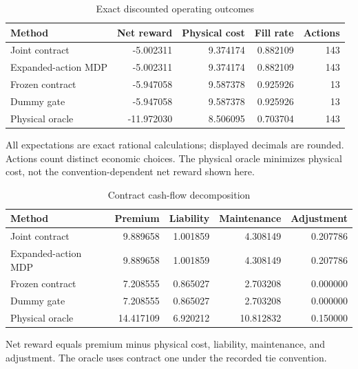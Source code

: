 \begin{table}[!ht]
\centering
\caption{Exact discounted operating outcomes}
\label{tab:exact}
\begin{tabular}{lrrrr}
\toprule
Method & Net reward & Physical cost & Fill rate & Actions\\
\midrule
Joint contract & -5.002311 & 9.374174 & 0.882109 & 143\\
Expanded-action MDP & -5.002311 & 9.374174 & 0.882109 & 143\\
Frozen contract & -5.947058 & 9.587378 & 0.925926 & 13\\
Dummy gate & -5.947058 & 9.587378 & 0.925926 & 13\\
Physical oracle & -11.972030 & 8.506095 & 0.703704 & 143\\
\bottomrule
\end{tabular}
\par\smallskip
\begin{minipage}{0.98\textwidth}\small All expectations are exact rational calculations; displayed decimals are rounded. Actions count distinct economic choices. The physical oracle minimizes physical cost, not the convention-dependent net reward shown here.\end{minipage}
\end{table}

\begin{table}[!ht]
\centering
\caption{Contract cash-flow decomposition}
\label{tab:ledger}
\begin{tabular}{lrrrr}
\toprule
Method & Premium & Liability & Maintenance & Adjustment\\
\midrule
Joint contract & 9.889658 & 1.001859 & 4.308149 & 0.207786\\
Expanded-action MDP & 9.889658 & 1.001859 & 4.308149 & 0.207786\\
Frozen contract & 7.208555 & 0.865027 & 2.703208 & 0.000000\\
Dummy gate & 7.208555 & 0.865027 & 2.703208 & 0.000000\\
Physical oracle & 14.417109 & 6.920212 & 10.812832 & 0.150000\\
\bottomrule
\end{tabular}
\par\smallskip
\begin{minipage}{0.98\textwidth}\small Net reward equals premium minus physical cost, liability, maintenance, and adjustment. The oracle uses contract one under the recorded tie convention.\end{minipage}
\end{table}


